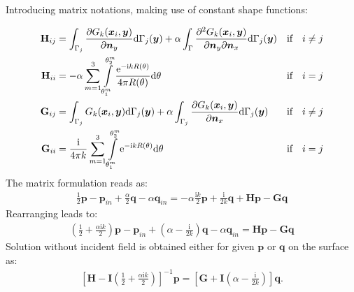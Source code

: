 \documentclass[a4paper, 10pt]{article}
\newcommand{\te}{\mathrm{e}}
\newcommand{\ti}{\mathrm{i}}
\newcommand{\td}{\mathrm{d}}
\newcommand{\sx}{\bm{\mathnormal{x}}}
\newcommand{\sy}{\bm{\mathnormal{y}}}
\newcommand{\sn}{\bm{\mathnormal{n}}}
\newcommand{\bp}{\mathbf{p}}
\newcommand{\bq}{\mathbf{q}}
\newcommand{\bH}{\mathbf{H}}
\newcommand{\bG}{\mathbf{G}}
\newcommand{\bI}{\mathbf{I}}
\newcommand{\summ}{\sum\limits_{m=1}^3}
\newcommand{\intms}{\int\limits_{\theta_1^m}^{\theta_2^m}}
\begin{document}
Introducing matrix notations, making use of constant shape functions:

\begin{align}
	\bH_{ij}
	& = \int_{\Gamma_j}\frac{\partial{G}_k (\sx_i, \sy)}{\partial \sn_y} \td \Gamma_j(\sy)
	+ \alpha \int_\Gamma \frac{\partial^2{G}_k (\sx_i, \sy)}{\partial \sn_y \partial \sn_x} \td \Gamma_j(\sy)
	& \text{if} \quad i \ne j \nonumber \\
	\bH_{ii}
	& = - \alpha \summ \intms \frac{\te ^{-\ti k R(\theta)}}{4 \pi R(\theta)} \mathrm{d} \theta 
	& \text{if} \quad i = j \nonumber \\
	\bG_{ij}
	& = \int_{\Gamma_j} G_k(\sx_i,\sy) \td \Gamma_j(\sy)
	+ \alpha \int_{\Gamma_j} \frac{\partial{G}_k (\sx_i, \sy)}{\partial \sn_x} \td \Gamma_j(\sy)
	& \text{if} \quad i \ne j \nonumber \\
	\bG_{ii}
	& = \frac{\ti}{4\pi k}\summ \intms \te ^{-\ti kR(\theta)} \mathrm{d} \theta 
	& \text{if} \quad i = j
\end{align}
%
The matrix formulation reads as:
%
\begin{align}
	\frac{1}{2} \mathbf{p} - \mathbf{p}_{in} + \frac{\alpha}{2} \mathbf{q} - \alpha \mathbf{q}_{in} = - \alpha \frac{\ti k}{2} \bp 
	+ \frac{\ti }{2k} \bq + \bH \bp - \bG \bq
\end{align}
%
Rearranging leads to:
%
\begin{align}
	\left(\frac{1}{2} + \frac{\alpha \ti k}{2}\right)\bp - \bp_{in}+ \left(\alpha - \frac{\ti }{2 k}\right) \bq - \alpha \bq_{in} =\bH \bp - \bG \bq
\end{align}
%
Solution without incident field is obtained either for given $\bp$ or $\bq$ on the surface as:
%
\begin{align}
	\left[\bH - \bI\left(\frac{1}{2} + \frac{\alpha \ti k}{2}\right) \right]^{-1} \bp = \left[\bG + \bI \left(\alpha - \frac{\ti}{2k}\right) \right] \bq .
\end{align}
\end{document}
